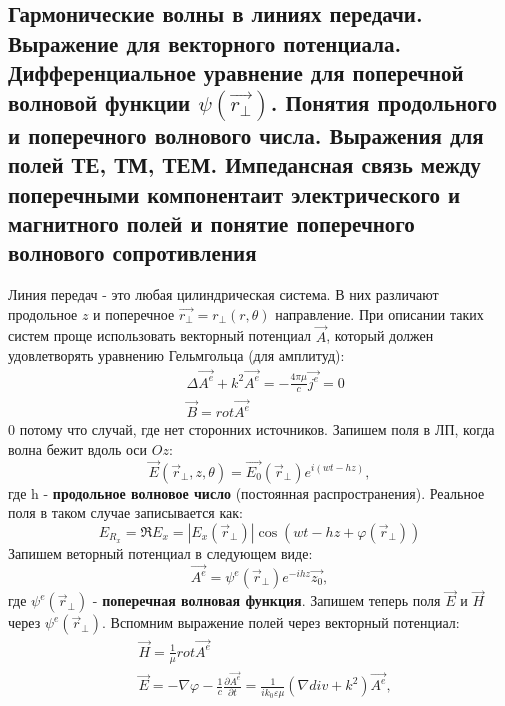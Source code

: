 
\subsection{Гармонические волны в линиях передачи. Выражение для векторного потенциала. Дифференциальное уравнение для
поперечной волновой функции $\psi(\vec{r_{\perp}})$. Понятия продольного и поперечного волнового числа. Выражения для
полей ТЕ, ТМ, ТЕМ. Импедансная связь между поперечными компонентаит электрического и магнитного полей и понятие
поперечного волнового сопротивления}

Линия передач - это любая цилиндрическая система. В них различают продольное $z$ и поперечное $\vec{r_{\perp}} = r_{\perp}(r,\theta)$ направление. При описании
таких систем проще использовать векторный потенциал $\vec{A}$, который должен удовлетворять уравнению Гельмгольца (для амплитуд):
\begin{align*}
  &\Delta \vec{A^e} + k^2 \vec{A^e} = -\frac{4 \pi \mu}{c} \vec{j^e}  =0 \\
  &\vec{B} = rot \vec{A^e}
  \label{eq:1}
\end{align*}
0 потому что случай, где нет сторонних источников. Запишем поля в ЛП, когда волна бежит вдоль оси $Oz$:
\begin{equation}
  \vec{E}(\vec{r}_{\perp},z,\theta) = \vec{E_0}(\vec{r}_{\perp}) e^{i(wt-hz)},
  \label{eq:2}
\end{equation}
где h - \textbf{продольное волновое число} (постоянная распространения). Реальное поля в таком случае записывается как:
\begin{equation}
  E_{R_x} = \Re{E_x} = |E_x(\vec{r}_{\perp})|\cos (wt-hz + \varphi(\vec{r}_{\perp}))
  \label{eq:3}
\end{equation}
Запишем веторный потенциал в следующем виде:
\begin{equation}
  \vec{A^e} = \psi^e(\vec{r}_{\perp})e^{-ihz}\vec{z_0},
  \label{eq:4}
\end{equation}
где $\psi^e(\vec{r}_{\perp})$ - \textbf{поперечная волновая функция}. Запишем теперь поля $\vec{E}$ и $\vec{H}$ через
$\psi^e(\vec{r}_{\perp})$. Вспомним выражение полей через векторный потенциал:
\begin{align*}
  &\vec{H} = \frac{1}{\mu}rot \vec{A^e}\\
  &\vec{E} = -\nabla \varphi - \frac{1}{c}\frac{\partial\vec{A^e}}{\partial t} = \frac{1}{ik_0\varepsilon\mu}(\nabla div + k^2)\vec{A^e},
  \label{eq:5}
\end{align*} 
